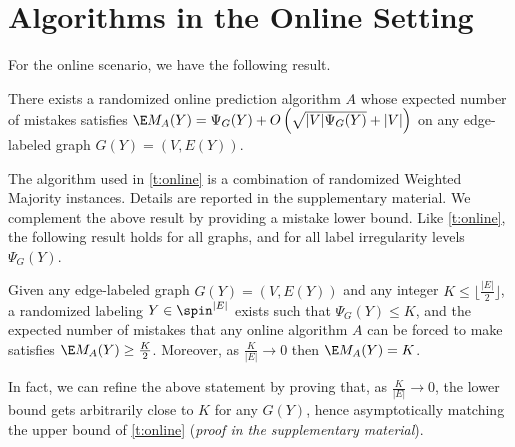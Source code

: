 \section{Algorithms in the Online Setting}\label{s:algonline}

For the online scenario, we have the following result.

\begin{theorem}\label{t:online}
  There exists a randomized online prediction algorithm $A$ whose expected number of mistakes
  satisfies $\E M_A(Y) = \Psi_G(Y) + O\left(\sqrt{|V|\Psi_G(Y)} + |V| \right)$
  on any edge-labeled graph $G(Y) = (V,E(Y))$.
\end{theorem}

The algorithm used in \autoref{t:online} is a combination of randomized Weighted Majority instances.
Details are reported in the supplementary material. We complement the above result by providing a
mistake lower bound. Like \autoref{t:online}, the following result holds for all graphs, and for all
label irregularity levels $\Psi_G(Y)$.

\begin{theorem}\label{t:mistake_bound}
  Given any edge-labeled graph $G(Y) = (V,E(Y))$ and any integer $K \le \big\lfloor
  \tfrac{|E|}{2}\big\rfloor$, a randomized labeling $Y\in\spin^{|E|}$ exists such that $\Psi_G(Y)
  \leq K$, and the expected number of mistakes that any online algorithm $A$ can be forced to make
  satisfies $\E M_A(Y) \ge \frac{K}{2}$.  Moreover, as $\frac{K}{|E|} \rightarrow 0$ then $\E M_A(Y)
  = K$.
\end{theorem}

In fact, we can refine the above statement by proving that, as $\frac{K}{|E|} \rightarrow 0$, the
lower bound gets arbitrarily close to $K$ for any $G(Y)$, hence asymptotically matching the upper
bound of \autoref{t:online} (\textit{proof in the supplementary material}).
